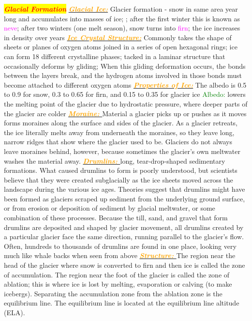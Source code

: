 \documentclass{article}
\author{SBHS Science Olympiad, Gold}
\newcommand{\red}[1]{\textcolor{red}{#1}}
\newcommand{\green}[1]{\textcolor{green}{#1}}
\newcommand{\pink}[1]{\textcolor{magenta}{#1}}
\newcommand{\orange}[1]{\textcolor{orange}{#1}}
\newcommand{\mysection}[1]{\colorbox{yellow}{{\textbf{\textbf{\textit{\red{#1}}}}}}}
\newcommand{\mysub}[1]{\underline{\textbf{{\textit{\orange{#1}}}}}}
\newcommand{\mysubsub}[1]{{{\green{#1}}}}
\newcommand{\vocab}[1]{{\pink{#1}}}
\begin{document}
	 \tiny
	\begin{multicols*}{4}
	
	
	
	
	
	\mysection{Glacial Formation} %
		\mysub {Glacial Ice:}
		Glacier formation - snow in same area year long and accumulates into masses of ice; ; after the first winter this is known as \vocab{neve}; after two winters (one melt season), snow turns into \vocab{firn}; the ice increases in density over years
		\mysub{Ice Crystal Structure:} 
		Commonly takes the shape of sheets or planes of oxygen atoms joined in a series of open hexagonal rings; ice can form 18 different crystalline phases; tacked in a laminar structure that occasionally deforms by gliding; When this gliding deformation occurs, the bonds between the layers break, and the hydrogen atoms involved in those bonds must become attached to different oxygen atoms
		\mysub{Properties of Ice:} The albedo is 0.5 to 0.9 for snow, 0.3 to 0.65 for firn, and 0.15 to 0.35 for glacier ice
		\mysubsub{Albedo:} lowers the melting point of the glacier due to hydrostatic pressure, where deeper parts of the glacier are colder
		\mysub{Moraine: }
		Material a glacier picks up or pushes as it moves forms moraines along the surface and sides of the glacier. As a glacier retreats, the ice literally melts away from underneath the moraines, so they leave long, narrow ridges that show where the glacier used to be. Glaciers do not always leave moraines behind, however, because sometimes the glacier’s own meltwater washes the material away.
		\mysub{Drumlins: } long, tear-drop-shaped sedimentary formations. What caused drumlins to form is poorly understood, but scientists believe that they were created subglacially as the ice sheets moved across the landscape during the various ice ages. Theories suggest that drumlins might have been formed as glaciers scraped up sediment from the underlying ground surface, or from erosion or deposition of sediment by glacial meltwater, or some combination of these processes. Because the till, sand, and gravel that form drumlins are deposited and shaped by glacier movement, all drumlins created by a particular glacier face the same direction, running parallel to the glacier's flow. Often, hundreds to thousands of drumlins are found in one place, looking very much like whale backs when seen from above
		\mysub{Structure: }The region near the head of the glacier where snow is converted to firn and then ice is called the zone of accumulation.  The region near the foot of the glacier is called the zone of ablation; this is where ice is lost by melting, evaporation or calving (to make icebergs).  Separating the accumulation zone from the ablation zone is the equilibrium line. The equilibrium line is located at the equilibrium line altitude (ELA).

\end{multicols*}
\end{document}
